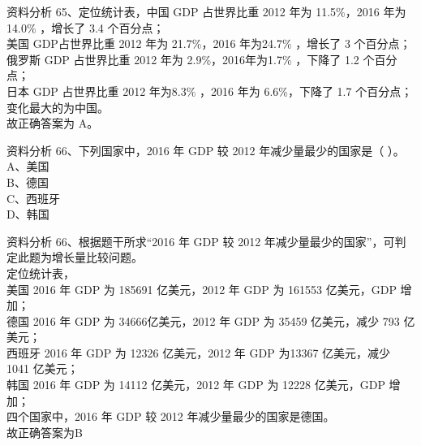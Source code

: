 \documentclass[aspectratio=169]{beamer}
\begin{document}
\begin{frame}[t]{资料分析}
    65、定位统计表，中国 GDP 占世界比重 2012 年为 11.5\%，2016 年为14.0\% ，增长了 3.4 个百分点；\\
    美国 GDP占世界比重 2012 年为 21.7\%，2016 年为24.7\% ，增长了 3 个百分点；\\
    俄罗斯 GDP 占世界比重 2012 年为 2.9\%，2016年为1.7\% ，下降了 1.2 个百分点；\\
    日本 GDP 占世界比重 2012 年为8.3\% ，2016 年为 6.6\%，下降了 1.7 个百分点；\\
    变化最大的为中国。\\
    故正确答案为 A。\\
\end{frame}                           


\begin{frame}[t]{资料分析}
    66、下列国家中，2016 年 GDP 较 2012 年减少量最少的国家是（ ）。\\
    A、美国                                                        \\
    B、德国                                                        \\
    C、西班牙                                                      \\
    D、韩国                                                        \\
\end{frame}                           

\begin{frame}[t]{资料分析}
    66、根据题干所求“2016 年 GDP 较 2012 年减少量最少的国家”，可判定此题为增长量比较问题。\\
    定位统计表，\\
    美国 2016 年 GDP 为 185691 亿美元，2012 年 GDP 为 161553 亿美元，GDP 增加；\\
    德国 2016 年 GDP 为 34666亿美元，2012 年 GDP 为 35459 亿美元，减少 793 亿美元；\\
    西班牙 2016 年 GDP 为 12326 亿美元，2012 年 GDP 为13367 亿美元，减少 1041 亿美元；\\
    韩国 2016 年 GDP 为 14112 亿美元，2012 年 GDP 为 12228 亿美元，GDP 增加；\\
    四个国家中，2016 年 GDP 较 2012 年减少量最少的国家是德国。\\
    故正确答案为B\\

\end{frame}                           
\end{document}
